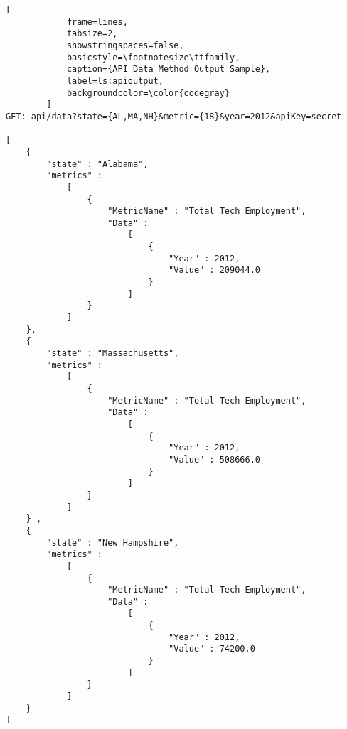 \begin{appendices}
		\begingroup\onehalfspacing
	
		\begin{lstlisting}[
			frame=lines,
			tabsize=2,
			showstringspaces=false,
			basicstyle=\footnotesize\ttfamily,
			caption={API Data Method Output Sample}, 
			label=ls:apioutput, 
			backgroundcolor=\color{codegray}
		]
GET: api/data?state={AL,MA,NH}&metric={18}&year=2012&apiKey=secret

[
	{
		"state" : "Alabama", 
		"metrics" : 
			[ 
				{ 
					"MetricName" : "Total Tech Employment", 
					"Data" : 
						[ 
							{ 
								"Year" : 2012, 
								"Value" : 209044.0 
							} 
						] 
				} 
			] 
	},
	{ 
		"state" : "Massachusetts",
		"metrics" : 
			[ 
				{ 
					"MetricName" : "Total Tech Employment", 
					"Data" : 
						[ 
							{ 
								"Year" : 2012,
								"Value" : 508666.0 
							} 
						] 
				} 
			] 
	} ,
	{ 
		"state" : "New Hampshire", 
		"metrics" : 
			[ 
				{ 
					"MetricName" : "Total Tech Employment", 
					"Data" : 
						[ 
							{ 
								"Year" : 2012, 
								"Value" : 74200.0 
							} 
						] 
				} 
			] 
	}
]
		\end{lstlisting}
		
		\endgroup

\end{appendices}